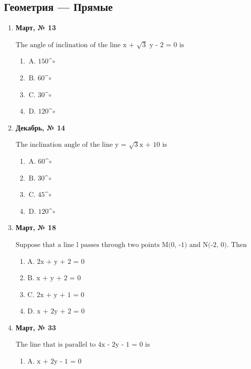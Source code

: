 \subsection*{Геометрия — Прямые}
\begin{enumerate}
\item \textbf{Март, № 13} \par \smallskip
$\displaystyle \text{The angle of inclination of the line x + }\sqrt{3}\text{ y - 2 = 0 is}$
\begin{enumerate}
\item $\displaystyle \text{A. 150^}\circ\text{ }$
\item $\displaystyle \text{B. 60^}\circ\text{ }$
\item $\displaystyle \text{C. 30^}\circ\text{ }$
\item $\displaystyle \text{D. 120^}\circ\text{ }$
\end{enumerate}
\item \textbf{Декабрь, № 14} \par \smallskip
$\displaystyle \text{The inclination angle of the line y = }\sqrt{3}\text{x + 10 is}$
\begin{enumerate}
\item $\displaystyle \text{A. 60^}\circ\text{ }$
\item $\displaystyle \text{B. 30^}\circ\text{ }$
\item $\displaystyle \text{C. 45^}\circ\text{ }$
\item $\displaystyle \text{D. 120^}\circ\text{ }$
\end{enumerate}
\item \textbf{Март, № 18} \par \smallskip
$\displaystyle \text{Suppose that a line l passes through two points M(0, -1) and N(-2, 0). Then the equation of l is}$
\begin{enumerate}
\item $\displaystyle \text{A. 2x + y + 2 = 0}$
\item $\displaystyle \text{B. x + y + 2 = 0}$
\item $\displaystyle \text{C. 2x + y + 1 = 0}$
\item $\displaystyle \text{D. x + 2y + 2 = 0}$
\end{enumerate}
\item \textbf{Март, № 33} \par \smallskip
$\displaystyle \text{The line that is parallel to 4x - 2y - 1 = 0 is}$
\begin{enumerate}
\item $\displaystyle \text{A. x + 2y - 1 = 0}$

\end{enumerate}
\end{enumerate}

